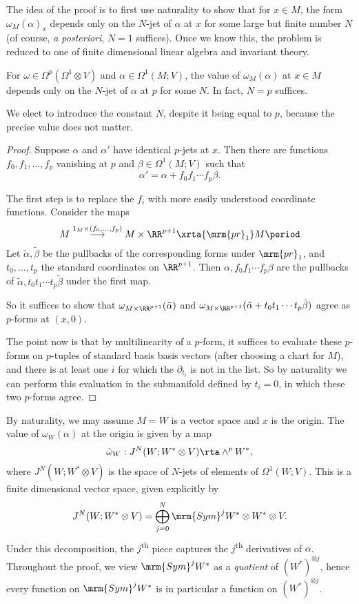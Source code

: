 The idea of the proof is to first use naturality to show that for $x \in M$, the form $\omega_M(\alpha)_x$ depends only on the $N$-jet of $\alpha$ at $x$ for some large but finite number $N$ (of course, \emph{a posteriori}, $N = 1$ suffices). Once we know this, the problem is reduced to one of finite dimensional linear algebra and invariant theory.

\begin{lem}
  For $\omega \in \Omega^p(\Omega^1 \otimes V)$ and $\alpha \in \Omega^1(M; V)$, the value of $\omega_M(\alpha)$ at $x \in M$ depends only on the $N$-jet of $\alpha$ at $p$ for some $N$. In fact, $N = p$ suffices.
\end{lem}
We elect to introduce the constant $N$, despite it being equal to $p$, because the precise value does not matter.

\begin{proof}
  Suppose $\alpha$ and $\alpha'$ have identical $p$-jets at $x$. Then there are functions $f_0, f_1, \ldots, f_p$ vanishing at $p$ and $\beta \in \Omega^1(M; V)$ such that
  \[ \alpha' = \alpha + f_0 f_1 \cdots f_p \beta. \]

  The first step is to replace the $f_i$ with more easily understood coordinate functions. Consider the maps
 \[M\overset{1_M\times(f_0,\dots,f_p)}{\longrightarrow} M\times\RR^{p+1}\xrta{\mrm{pr}_1}M\period\]
  Let $\tilde{\alpha}, \tilde{\beta}$ be the pullbacks of the corresponding forms under $\mrm{pr}_1$, and $t_0, \ldots, t_p$ the standard coordinates on $\RR^{p + 1}$. Then $\alpha, f_0 f_1\cdots f_p \beta$ are the pullbacks of $\tilde{\alpha}, t_0 t_1\cdots t_p \tilde{\beta}$ under the first map.

  So it suffices to show that $\omega_{M \times \RR^{p + 1}}(\tilde{\alpha})$ and $\omega_{M \times \RR^{p + 1}}(\tilde{\alpha} + t_0 t_1 \cdots t_p \tilde{\beta})$ agree as $p$-forms at $(x, 0)$.

  The point now is that by multilinearity of a $p$-form, it suffices to evaluate these $p$-forms on $p$-tuples of standard basis basis vectors (after choosing a chart for $M$), and there is at least one $i$ for which the $\partial_{t_i}$ is not in the list. So by naturality we can perform this evaluation in the submanifold defined by $t_i = 0$, in which these two $p$-forms agree. 
\end{proof}

By naturality, we may assume $M = W$ is a vector space and $x$ is the origin. The value of $\omega_W(\alpha)$ at the origin is given by a map
\[
  \tilde{\omega}_W: J^N(W; W^* \otimes V) \rta \wedge^p W^*,
\]
where $J^N(W; W^* \otimes V)$ is the space of $N$-jets of elements of $\Omega^1(W; V)$. This is a finite dimensional vector space, given explicitly by
\[
  J^N(W; W^* \otimes V) = \bigoplus_{j = 0}^N \mrm{Sym}^j W^* \otimes W^* \otimes V.
\]
Under this decomposition, the $j$\textsuperscript{th} piece captures the $j$\textsuperscript{th} derivatives of $\alpha$. Throughout the proof, we view $\mrm{Sym}^j W^*$ as a \emph{quotient} of $(W^*)^{\otimes j}$, hence every function on $\mrm{Sym}^j W^*$ is in particular a function on $(W^*)^{\otimes j}$.

